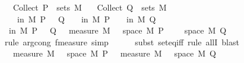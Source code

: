 \begin{isabellebody}
\ \ \ {\isachardoublequoteopen}Collect\ P\ {\isasymin}\ sets\ M{\isachardoublequoteclose}\isanewline
\ \ \ {\isachardoublequoteopen}Collect\ Q\ {\isasymin}\ sets\ M{\isachardoublequoteclose}\isanewline
\ \ \ {\isachardoublequoteopen}{\isasymP}{\isacharparenleft}{\kern0pt}{\isasymomega}\ in\ M{\isachardot}{\kern0pt}\ P\ {\isasymomega}\ {\isasymor}\ Q\ {\isasymomega}{\isacharparenright}{\kern0pt}\ {\isasymle}\ {\isasymP}{\isacharparenleft}{\kern0pt}{\isasymomega}\ in\ M{\isachardot}{\kern0pt}\ P\ {\isasymomega}{\isacharparenright}{\kern0pt}\ {\isacharplus}{\kern0pt}\ {\isasymP}{\isacharparenleft}{\kern0pt}{\isasymomega}\ in\ M{\isachardot}{\kern0pt}\ Q\ {\isasymomega}{\isacharparenright}{\kern0pt}{\isachardoublequoteclose}\isanewline
%
\isadelimproof
%
\endisadelimproof
%
\isatagproof
{}\isamarkupfalse%
\ {\isacharminus}{\kern0pt}\isanewline
\ \ \isamarkupfalse%
\ {\isachardoublequoteopen}{\isasymP}{\isacharparenleft}{\kern0pt}{\isasymomega}\ in\ M{\isachardot}{\kern0pt}\ P\ {\isasymomega}\ {\isasymor}\ Q\ {\isasymomega}{\isacharparenright}{\kern0pt}\ {\isacharequal}{\kern0pt}\ measure\ M\ {\isacharparenleft}{\kern0pt}{\isacharbraceleft}{\kern0pt}{\isasymomega}\ {\isasymin}\ space\ M{\isachardot}{\kern0pt}\ P\ {\isasymomega}{\isacharbraceright}{\kern0pt}\ {\isasymunion}\ {\isacharbraceleft}{\kern0pt}{\isasymomega}\ {\isasymin}\ space\ M{\isachardot}{\kern0pt}\ Q\ {\isasymomega}{\isacharbraceright}{\kern0pt}{\isacharparenright}{\kern0pt}{\isachardoublequoteclose}\isanewline
\ \ \ \ \isamarkupfalse%
\ {\isacharparenleft}{\kern0pt}rule\ arg{\isacharunderscore}{\kern0pt}cong{}{\isacharbrackleft}{\kern0pt}\ f{\isacharequal}{\kern0pt}{\isachardoublequoteopen}measure{\isachardoublequoteclose}{\isacharbrackright}{\kern0pt}{\isacharcomma}{\kern0pt}\ simp{\isacharparenright}{\kern0pt}\isanewline
\ \ \ \ \isamarkupfalse%
\ {\isacharparenleft}{\kern0pt}subst\ set{\isacharunderscore}{\kern0pt}eq{\isacharunderscore}{\kern0pt}iff{\isacharcomma}{\kern0pt}\ rule\ allI{\isacharcomma}{\kern0pt}\ blast{\isacharparenright}{\kern0pt}\isanewline
\ \ \isamarkupfalse%
\ \isamarkupfalse%
\ {\isachardoublequoteopen}{\isachardot}{\kern0pt}{\isachardot}{\kern0pt}{\isachardot}{\kern0pt}\ {\isasymle}\ measure\ M\ {\isacharbraceleft}{\kern0pt}{\isasymomega}\ {\isasymin}\ space\ M{\isachardot}{\kern0pt}\ P\ {\isasymomega}{\isacharbraceright}{\kern0pt}\ {\isacharplus}{\kern0pt}\ measure\ M\ {\isacharbraceleft}{\kern0pt}{\isasymomega}\ {\isasymin}\ space\ M{\isachardot}{\kern0pt}\ Q\ {\isasymomega}{\isacharbraceright}{\kern0pt}{\isachardoublequoteclose}\isanewline

\end{isabellebody}
